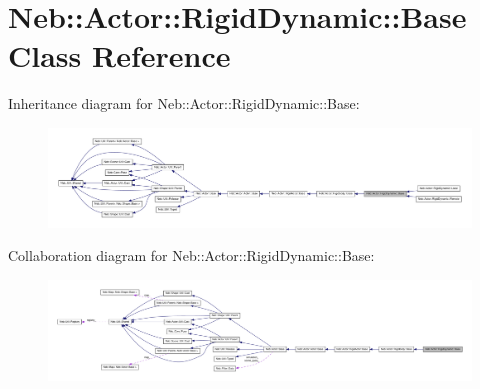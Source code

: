 \hypertarget{classNeb_1_1Actor_1_1RigidDynamic_1_1Base}{\section{\-Neb\-:\-:\-Actor\-:\-:\-Rigid\-Dynamic\-:\-:\-Base \-Class \-Reference}
\label{classNeb_1_1Actor_1_1RigidDynamic_1_1Base}
}


\-Inheritance diagram for \-Neb\-:\-:\-Actor\-:\-:\-Rigid\-Dynamic\-:\-:\-Base\-:\nopagebreak
\begin{figure}[H]
\begin{center}
\leavevmode
\includegraphics[width=350pt]{classNeb_1_1Actor_1_1RigidDynamic_1_1Base__inherit__graph}
\end{center}
\end{figure}


\-Collaboration diagram for \-Neb\-:\-:\-Actor\-:\-:\-Rigid\-Dynamic\-:\-:\-Base\-:\nopagebreak
\begin{figure}[H]
\begin{center}
\leavevmode
\includegraphics[width=350pt]{classNeb_1_1Actor_1_1RigidDynamic_1_1Base__coll__graph}
\end{center}
\end{figure}

